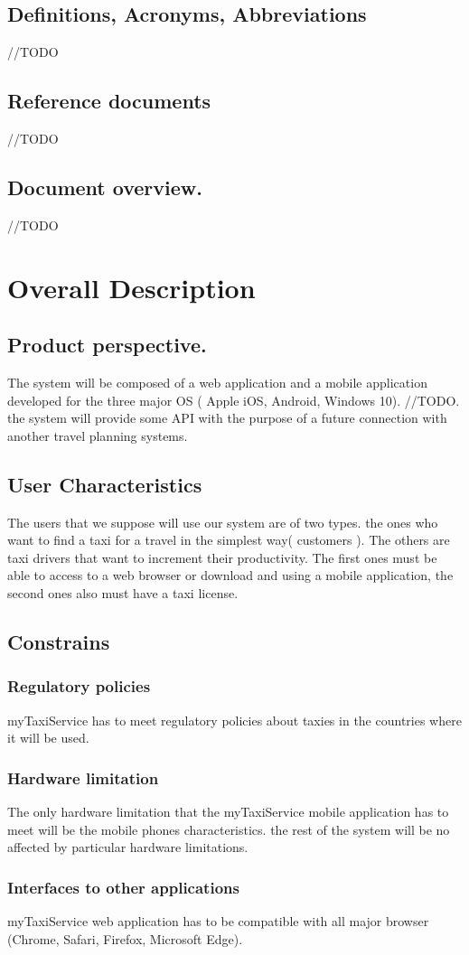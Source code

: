 \documentclass{report}
\begin{document}
		\section{Definitions, Acronyms, Abbreviations}
		//TODO
		
		\section{Reference documents}
		//TODO
		
		\section{Document overview.}
		//TODO
		
		\chapter{Overall Description}
		\section{Product perspective.}
		The system will be composed of a web application and a mobile application developed for the three major OS ( Apple iOS, Android, Windows 10). //TODO. the system will provide some API with the purpose of a future connection with another travel 				planning systems. 
		
		\section{User Characteristics }
		The users that we suppose will use our system are of two types. the ones who want to find a taxi for a travel in the simplest way( customers ). The others are taxi drivers that want to increment their productivity. The first ones must be able to access to a 		web browser or download and using a mobile application, the second ones also must have a taxi license.
		
		\section{Constrains}
			\subsection{Regulatory policies}
			myTaxiService  has to meet regulatory policies about taxies in the countries where it will be used.

			\subsection{Hardware limitation }
			The only hardware limitation that the myTaxiService mobile application has to meet will be the mobile phones characteristics. the rest of the system will be no affected by particular hardware limitations.

			\subsection{Interfaces to other applications}
			myTaxiService web application has to be compatible with all major browser (Chrome, Safari, Firefox, Microsoft Edge).
	
	
\end{document}
